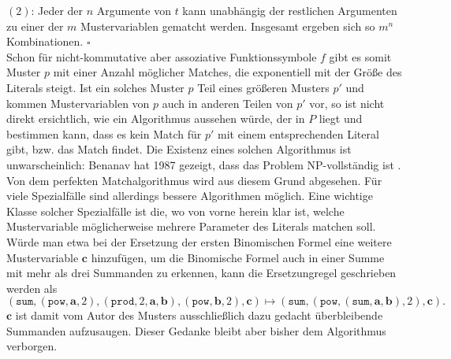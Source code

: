 $(2)$: Jeder der $n$ Argumente von $t$ kann unabhängig der restlichen Argumenten zu einer der $m$ Mustervariablen gematcht werden. Insgesamt ergeben sich so $m^n$ Kombinationen.
\hfill $\square$\\

Schon für nicht-kommutative aber assoziative Funktionssymbole $f$ gibt es somit Muster $p$ mit einer Anzahl möglicher Matches, die exponentiell mit der Größe des Literals steigt. Ist ein solches Muster $p$ Teil eines größeren Musters $p'$ und kommen Mustervariablen von $p$ auch in anderen Teilen von $p'$ vor, so ist nicht direkt ersichtlich, wie ein Algorithmus aussehen würde, der in $P$ liegt und bestimmen kann, dass es kein Match für $p'$ mit einem entsprechenden Literal gibt, bzw. das Match findet. Die Existenz eines solchen Algorithmus ist unwarscheinlich: Benanav hat 1987 gezeigt, dass das Problem NP-vollständig ist \cite{NPHardMatching}.
Von dem perfekten Matchalgorithmus wird aus diesem Grund abgesehen. Für viele Spezialfälle sind allerdings bessere Algorithmen möglich. Eine wichtige Klasse solcher Spezialfälle ist die, wo von vorne herein klar ist, welche Mustervariable möglicherweise mehrere Parameter des Literals matchen soll. Würde man etwa bei der Ersetzung der ersten Binomischen Formel eine weitere Mustervariable $\mathbf c$ hinzufügen, um die Binomische Formel auch in einer Summe mit mehr als drei Summanden zu erkennen, kann die Ersetzungregel geschrieben werden als
$$(\texttt{sum}, (\texttt{pow}, \mathbf a, 2), (\texttt{prod}, 2, \mathbf a, \mathbf b), (\texttt{pow}, \mathbf b, 2), \mathbf c) \mapsto (\texttt{sum}, (\texttt{pow}, (\texttt{sum}, \mathbf a, \mathbf b), 2), \mathbf c).$$
$\mathbf c$ ist damit vom Autor des Musters ausschließlich dazu gedacht überbleibende Summanden \glqq aufzusaugen\grqq{}. Dieser Gedanke bleibt aber bisher dem Algorithmus verborgen.
